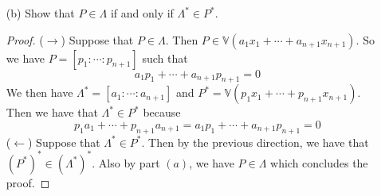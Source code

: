 \documentclass{article}
\begin{document}
\begin{itemize}
        \item [(b)] Show that $P \in \Lambda$ if and only if $ \Lambda^{*} \in P^{*}$. 
            \begin{proof}
                ($\rightarrow$) Suppose that $P \in \Lambda$. Then $P \in \mathbb{V}(a_{1}x_{1} + \cdots + a_{n + 1}x_{n + 1})$. So we have $P = [p_{1} : \cdots : p_{n + 1}]$ such that 
                    \begin{equation*}
                        a_{1}p_{1} + \cdots + a_{n + 1}p_{n + 1} = 0
                    \end{equation*}
                We then have $\Lambda^{*} = [a_{1} : \cdots : a_{n + 1}]$ and $P^{*} = \mathbb{V}(p_{1}x_{1} + \cdots + p_{n + 1}x_{n + 1})$. Then we have that $\Lambda^{*} \in P^{*}$ because
                    \begin{equation*}
                        p_{1}a_{1} + \cdots + p_{n + 1}a_{n + 1} = a_{1}p_{1} + \cdots + a_{n + 1}p_{n + 1} = 0
                    \end{equation*}
                ($\leftarrow$) Suppose that $\Lambda^{*} \in P^{*}$. Then by the previous direction, we have that $(P^{*})^{*} \in ( \Lambda^{*})^{*}$. Also by part $(a)$, we have $P \in \Lambda$ which concludes the proof.
            \end{proof}
    \end{itemize}
\end{document}
